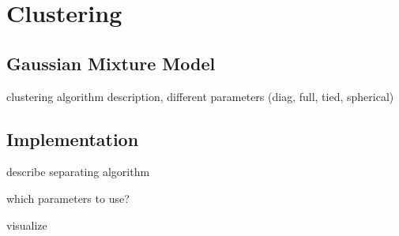 \chapter{Clustering}

\section{Gaussian Mixture Model}
clustering algorithm description, different parameters (diag, full, tied, spherical)


\section{Implementation}
describe separating algorithm

which parameters to use?

visualize